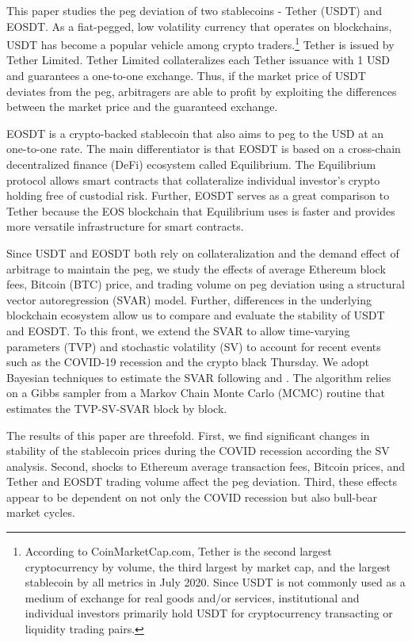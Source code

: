 \documentclass[12pt]{article}
\begin{document}
This paper studies the peg deviation of two stablecoins - Tether (USDT) and EOSDT. As a fiat-pegged, low volatility currency that operates on blockchains, USDT has become a popular vehicle among crypto traders.\footnote{According to CoinMarketCap.com, Tether is the second largest cryptocurrency by volume, the third largest by market cap, and the largest stablecoin by all metrics in July 2020. Since USDT is not commonly used as a medium of exchange for real goods and/or services, institutional and individual investors primarily hold USDT for cryptocurrency transacting or liquidity trading pairs.} Tether is issued by Tether Limited. Tether Limited collateralizes each Tether issuance with 1 USD and guarantees a one-to-one exchange. Thus, if the market price of USDT deviates from the peg, arbitragers are able to profit by exploiting the differences between the market price and the guaranteed exchange. 

EOSDT is a crypto-backed stablecoin that also aims to peg to the USD at an one-to-one rate. The main differentiator is that EOSDT is based on a cross-chain decentralized finance (DeFi) ecosystem called Equilibrium. The Equilibrium protocol allows smart contracts that collateralize individual investor's crypto holding free of custodial risk. Further, EOSDT serves as a great comparison to Tether because the EOS blockchain that Equilibrium uses is faster and provides more versatile infrastructure for smart contracts. 

Since USDT and EOSDT both rely on collateralization and the demand effect of arbitrage to maintain the peg, we study the effects of average Ethereum block fees, Bitcoin (BTC) price, and trading volume on peg deviation using a structural vector autoregression (SVAR) model. Further, differences in the underlying blockchain ecosystem allow us to compare and evaluate the stability of USDT and EOSDT. To this front, we extend the SVAR to allow time-varying parameters (TVP) and stochastic volatility (SV) to account for recent events such as the COVID-19 recession and the crypto black Thursday. We adopt Bayesian techniques to estimate the SVAR following \cite{primiceri} and \cite{cfp}. The algorithm relies on a Gibbs sampler from a Markov Chain Monte Carlo (MCMC) routine that estimates the TVP-SV-SVAR block by block. 

The results of this paper are threefold. First, we find significant changes in stability of the stablecoin prices during the COVID recession according the SV analysis. Second, shocks to Ethereum average transaction fees, Bitcoin prices, and Tether and EOSDT trading volume affect the peg deviation. Third, these effects appear to be dependent on not only the COVID recession but also bull-bear market cycles.
\end{document}
